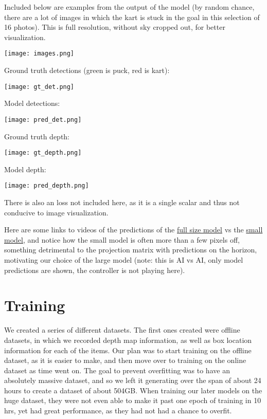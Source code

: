 \documentclass{article}
\begin{document}
Included below are examples from the output of the model (by random chance, there are a lot of images in which the kart is stuck in the goal in this selection of 16 photos). This is full resolution, without sky cropped out, for better visualization.

\texttt{[image: images.png]}

Ground truth detections (green is puck, red is kart):

\texttt{[image: gt\_det.png]}

Model detections:

\texttt{[image: pred\_det.png]}

Ground truth depth:

\texttt{[image: gt\_depth.png]}

Model depth:

\texttt{[image: pred\_depth.png]}

There is also an  loss not included here, as it is a single scalar and thus not conducive to image visualization.

Here are some links to videos of the predictions of the \textcolor{blue}{\href{https://youtu.be/N3YlUWsx3Hs}{full size model}} vs the \textcolor{blue}{\href{https://youtu.be/W5MlAdKf6C0}{small model}}, and notice how the small model is often more than a few pixels off, something detrimental to the projection matrix with predictions on the horizon, motivating our choice of the large model (note: this is AI vs AI, only model predictions are shown, the controller is not playing here).

\section{Training}
We created a series of different datasets. The first ones created were offline datasets, in which we recorded depth map information, as well as box location information for each of the items. Our plan was to start training on the offline dataset, as it is easier to make, and then move over to training on the online dataset as time went on. The goal to prevent overfitting was to have an absolutely massive dataset, and so we left it generating over the span of about 24 hours to create a dataset of about 504GB. When training our later models on the huge dataset, they were not even able to make it past one epoch of training in 10 hrs, yet had great performance, as they had not had a chance to overfit.
\end{document}
